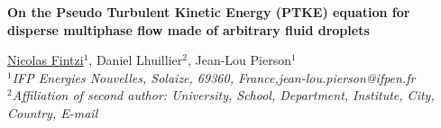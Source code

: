 \documentclass[12pt,a4paper]{article}
\begin{document}
\pagestyle{fancy}
\fancyhf{}

\lhead{\textcolor{mygray}{12th International Conference on Multiphase flow}}
\rhead{\textcolor{mygray}{ICMF 2025, Toulouse, France, May 12-16, 2025}}
\lfoot{}
\cfoot{}
\rfoot{}

\begin{center}
{\large {\bf On the Pseudo Turbulent Kinetic Energy (PTKE) equation for disperse multiphase flow made of arbitrary fluid droplets}}
\vspace{10pt}


\underline{Nicolas Fintzi}$^1$, Daniel Lhuillier$^2$, Jean-Lou Pierson$^1$\\
{\it
$^1$IFP Energies Nouvelles, Solaize, 69360, France,jean-lou.pierson@ifpen.fr\\
$^2$Affiliation of second author: University, School, Department, Institute, City, Country, E-mail\\
}
\end{center}
\end{document}
